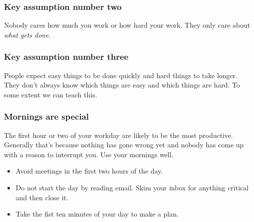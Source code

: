 \documentclass[10pt]{beamer}
\begin{document}
\begin{frame}
  \frametitle{Key assumption number two}

  Nobody cares how much you work or how hard your work. They only 
  care about \emph{what gets done}.
    
\end{frame}

\begin{frame}
  \frametitle{Key assumption number three}

  People expect easy things to be done quickly and hard things to take
  longer. They don't always know which things are easy and which things are hard.
  To some extent we can teach this.
      
\end{frame}

\begin{frame}
  \frametitle{Mornings are special}
  
  The first hour or two of your workday are likely to be the most productive.
  Generally that's because nothing has gone wrong yet and nobody has come up
  with a reason to interrupt you. Use your mornings well.
  
  \begin{itemize}
    \item Avoid meetings in the first two hours of the day.
    \item Do not start the day by reading email. Skim your inbox for
    anything critical and then close it.
    \item Take the fist ten minutes of your day to make a plan.
  \end{itemize}
     
\end{frame}
\end{document}
